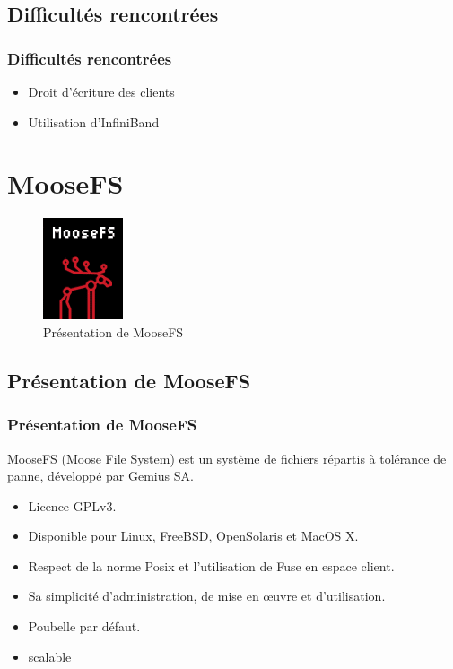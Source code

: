 \documentclass[blue]{beamer}
\begin{document}
	\subsection{Difficultés rencontrées}
	\begin{frame}
		\frametitle{Difficultés rencontrées}
			\begin{itemize}
				\item Droit d'écriture des clients
				\item Utilisation d'InfiniBand
			\end{itemize}
	\end{frame}


\section{MooseFS}
\begin{frame}
\begin{figure}
				\includegraphics[width=0.3\linewidth]{../images/moosefs.png}
				\caption{Présentation de MooseFS}
			\end{figure}
\end{frame}
\subsection{Présentation de MooseFS}
\begin{frame}
		\frametitle{Présentation de MooseFS}
MooseFS (Moose File System) est un système de fichiers répartis à tolérance de panne, développé par Gemius SA.
		\begin{itemize}
			\item Licence GPLv3.
			\item Disponible pour Linux, FreeBSD, OpenSolaris et MacOS X.
			\item Respect de la norme Posix et l’utilisation de Fuse en espace client.
			\item Sa simplicité d’administration, de mise en œuvre et d'utilisation.
			\item Poubelle par défaut.
			\item scalable 
		\end{itemize}
	\end{frame}
	
\end{document}

